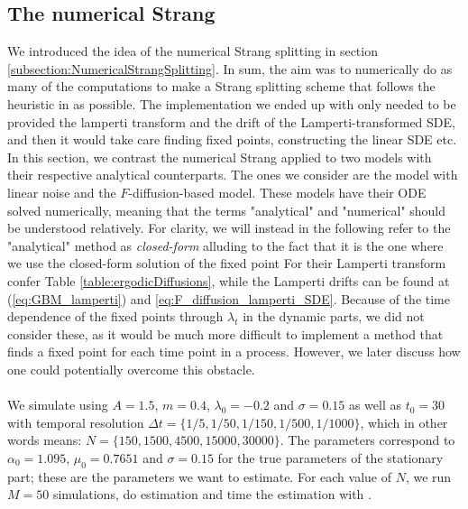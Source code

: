 \subsection{The numerical Strang}
We introduced the idea of the numerical Strang splitting in section \ref{subsection:NumericalStrangSplitting}. In sum, the aim was to numerically do as many of the computations to make a Strang splitting scheme that follows the heuristic in \cite{SplittingSchemes} as possible. The implementation we ended up with only needed to be provided the lamperti transform and the drift of the Lamperti-transformed SDE, and then it would take care finding fixed points, constructing the linear SDE etc. In this section, we contrast the numerical Strang applied to two models with their respective analytical counterparts. The ones we consider are the model with linear noise and the $F$-diffusion-based model. 
These models have their ODE solved numerically, meaning that the terms "analytical" and "numerical" should be understood relatively. For clarity, we will instead in the following refer to the "analytical" method as \textit{closed-form} alluding to the fact that it is the one where we use the closed-form solution of the fixed point For their Lamperti transform confer Table \ref{table:ergodicDiffusions}, while the Lamperti drifts can be found at (\ref{eq:GBM_lamperti}) and \ref{eq:F_diffusion_lamperti_SDE}. Because of the time dependence of the fixed points through $\lambda_t$ in the dynamic parts, we did not consider these, as it would be much more difficult to implement a method that finds a fixed point for each time point in a process. However, we later discuss how one could potentially overcome this obstacle.\\\\
We simulate using $A = 1.5$, $m=0.4$, $\lambda_0 = -0.2$ and $\sigma =0.15$ as well as $t_0 = 30$ with temporal resolution $\Delta t = \{1/5, 1/50, 1/150, 1/500, 1/1000\}$, which in other words means: $N =  \{150, 1500, 4500, 15000, 30000\}$.  The parameters correspond to $\alpha_0 = 1.095$, $\mu_0 = 0.7651$ and $\sigma = 0.15$ for the true parameters of the stationary part; these are the parameters we want to estimate. For each value of $N$, we run $M = 50$ simulations, do estimation and time the estimation with .

